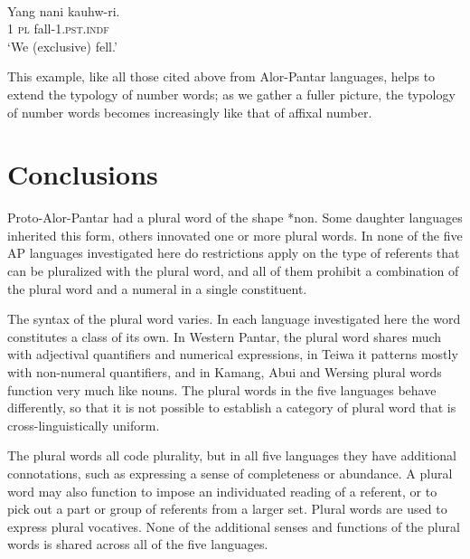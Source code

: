 \ea%
\label{ex:9:113}
 \\
\gll   Yang nani {kauhw-ri.}\\
  1 \textsc{pl} fall-1.\textsc{pst.indf}  \\
\glt `We (exclusive) fell.'
\z






This example, like all those cited above from Alor-Pantar languages, helps to extend the typology of number words; as we gather a fuller picture, the typology of number words becomes increasingly like that of affixal number.


\section{Conclusions} %
\label{sec:9:6}
Proto-Alor-Pantar had a plural word of the shape *{non}. Some daughter languages inherited this form, others innovated one or more plural words. In none of the five AP languages investigated here do restrictions apply on the type of referents that can be pluralized with the plural word, and all of them prohibit a combination of the plural word and a numeral in a single constituent.

 The syntax of the plural word varies. In each language investigated here the word constitutes a class of its own. In Western Pantar, the plural word shares much with adjectival quantifiers and numerical expressions, in Teiwa it patterns mostly with non-numeral quantifiers, and in Kamang, Abui and Wersing plural words function very much like nouns. The plural words in the five languages behave differently, so that it is not possible to establish a category of plural word that is cross-linguistically uniform.

 The plural words all code plurality, but in all five languages they have additional connotations, such as expressing a sense of completeness or abundance. A plural word may also function to impose an individuated reading of a referent, or to pick out a part or group of referents from a larger set. Plural words are used to express plural vocatives. None of the additional senses and functions of the plural words is shared across all of the five languages.

